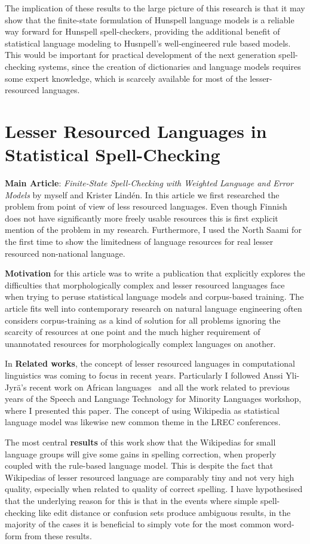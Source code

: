 \documentclass[officiallayout]{unihelcompling}
\begin{document}
The implication of these results to the large picture of this research is
that it may show that the finite-state formulation of Hunspell language models
is a reliable way forward for Hunspell spell-checkers, providing the additional
benefit of statistical language modeling to Husnpell's well-engineered
rule based models. This would be important for practical development of
the next generation spell-checking systems, since the creation of dictionaries
and language models requires some expert knowledge, which is scarcely available
for most of the lesser-resourced languages.

\section{Lesser Resourced Languages in Statistical Spell-Checking}
\label{sec:lesser-training}

\textbf{Main Article}: \emph{Finite-State Spell-Checking with Weighted Language
and Error Models} by myself and Krister Lindén. In this article we first
researched the problem from point of view of less resourced languages. Even
though Finnish does not have significantly more freely usable resources this
is first explicit mention of the problem in my research. Furthermore, I
used the North Saami for the first time to show the limitedness of language
resources for real lesser resourced non-national language.

\textbf{Motivation} for this article was to write a publication that explicitly
explores the difficulties that morphologically complex and lesser resourced
languages face when trying to peruse statistical language models and
corpus-based training. The article fits well into contemporary research on
natural language engineering often considers corpus-training as a kind of
solution for all problems ignoring the scarcity of resources at one point and
the much higher requirement of unannotated resources for morphologically
complex languages on another.

In \textbf{Related works}, the concept of lesser resourced languages in
computational linguistics was coming to focus in recent years. Particularly I
followed Anssi Yli-Jyrä's recent work on African
languages~\citep{yli2005toward} and all the work related to previous years of
the Speech and Language Technology for Minority Languages workshop, where I
presented this paper.  The concept of using Wikipedia as statistical language
model was likewise new common theme in the LREC conferences.

The most central \textbf{results} of this work show that the Wikipedias for
small language groups will give some gains in spelling correction, when
properly coupled with the rule-based language model. This is despite the fact
that Wikipedias of lesser resourced language are comparably tiny and not very
high quality, especially when related to quality of correct spelling.  I have
hypothesised that the underlying reason for this is that in the events where
simple spell-checking like edit distance or confusion sets produce ambiguous
results, in the majority of the cases it is beneficial to simply vote for the
most common word-form from these results.
\end{document}
